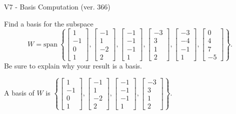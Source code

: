 \begin{exercise}
  \begin{exerciseTitle}V7 - Basis Computation (ver. 366)\end{exerciseTitle}
  \begin{exerciseStatement}
    Find a basis for the subspace 
\[W=\mathrm{span}\ \left\{\left[\begin{array}{r}
1 \\
-1 \\
0 \\
1
\end{array}\right] , \left[\begin{array}{r}
-1 \\
1 \\
-2 \\
2
\end{array}\right] , \left[\begin{array}{r}
-1 \\
-1 \\
-1 \\
1
\end{array}\right] , \left[\begin{array}{r}
-3 \\
3 \\
1 \\
2
\end{array}\right] , \left[\begin{array}{r}
-3 \\
-4 \\
-1 \\
1
\end{array}\right] , \left[\begin{array}{r}
0 \\
4 \\
7 \\
-5
\end{array}\right]\right\}.\]
 Be sure to explain why your result is a basis.


  \end{exerciseStatement}
  \begin{exerciseAnswer}
   A basis of \(W\) is  \(\left\{\left[\begin{array}{r}
1 \\
-1 \\
0 \\
1
\end{array}\right] , \left[\begin{array}{r}
-1 \\
1 \\
-2 \\
2
\end{array}\right] , \left[\begin{array}{r}
-1 \\
-1 \\
-1 \\
1
\end{array}\right] , \left[\begin{array}{r}
-3 \\
3 \\
1 \\
2
\end{array}\right]\right\}\).
  


  \end{exerciseAnswer}
\end{exercise}